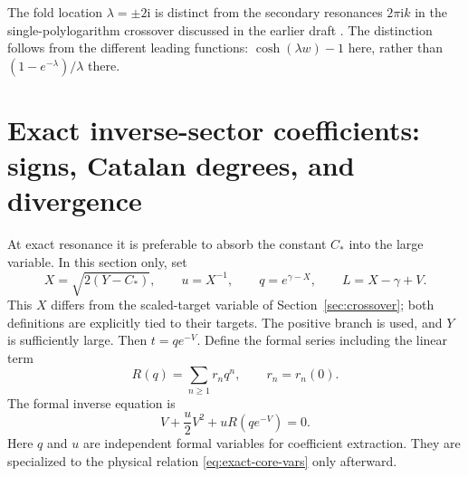 \documentclass[11pt,a4paper]{article}
\numberwithin{equation}{section}
\theoremstyle{definition}\newtheorem{definition}[theorem]{Definition}
\theoremstyle{remark}\newtheorem{remark}[theorem]{Remark}
\newcommand{\ii}{\mathrm i}
\begin{document}
The fold location $\lambda=\pm2\ii$ is distinct from the secondary
resonances $2\pi\ii k$ in the single-polylogarithm crossover discussed
in the earlier draft \cite{prior-folds}. The distinction follows from
the different leading functions: $\cosh(\lambda w)-1$ here, rather
than $(1-e^{-\lambda})/\lambda$ there.

\section{Exact inverse-sector coefficients: signs, Catalan degrees, and divergence}
\label{sec:coefficients}
At exact resonance it is preferable to absorb the constant $C_*$ into
the large variable. In this section only, set
\begin{equation}\label{eq:exact-core-vars}
 X=\sqrt{2(Y-C_*)},\qquad u=X^{-1},\qquad
 q=e^{\gamma-X},\qquad L=X-\gamma+V.
\end{equation}
This $X$ differs from the scaled-target variable of
Section~\ref{sec:crossover}; both definitions are explicitly tied to
their targets. The positive branch is used, and $Y$ is sufficiently
large. Then $t=qe^{-V}$. Define the formal series including the linear
term
\begin{equation}\label{eq:R-all}
 R(q)=\sum_{n\ge1}r_nq^n,\qquad r_n=r_n(0).
\end{equation}
The formal inverse equation is
\begin{equation}\label{eq:formal-inverse}
 V+\frac u2V^2+uR(qe^{-V})=0.
\end{equation}
Here $q$ and $u$ are independent formal variables for coefficient
extraction. They are specialized to the physical relation
\eqref{eq:exact-core-vars} only afterward.
\end{document}
